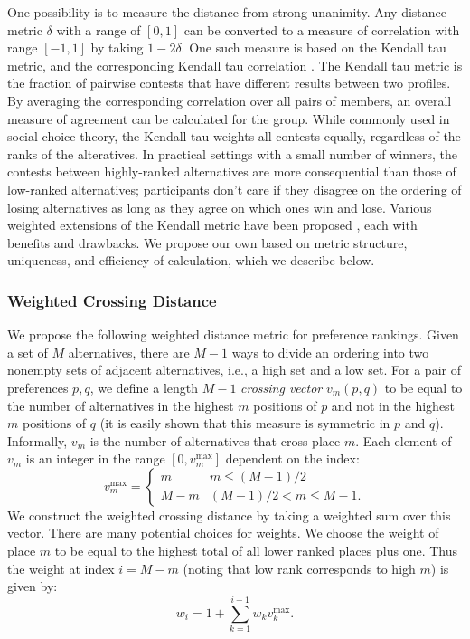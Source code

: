 One possibility is to measure the distance from strong unanimity.
Any distance metric $\delta$ with a range of $[0,1]$ can be converted to a measure of correlation with range $[-1, 1]$ by taking $1 - 2\delta$.
One such measure is based on the Kendall tau metric, and the corresponding Kendall tau correlation \cite{kendall_new_1938}.
The Kendall tau metric is the fraction of pairwise contests that have different results between two profiles.
By averaging the corresponding correlation over all pairs of members, an overall measure of agreement can be calculated for the group.
While commonly used in social choice theory, the Kendall tau weights all contests equally, regardless of the ranks of the alteratives.
In practical settings with a small number of winners, the contests between highly-ranked alternatives are more consequential than those of low-ranked alternatives;
participants don't care if they disagree on the ordering of losing alternatives as long as they agree on which ones win and lose.
Various weighted extensions of the Kendall metric have been proposed \cite{shieh_weighted_1998, can_weighted_2014},
each with benefits and drawbacks.
We propose our own based on metric structure, uniqueness, and efficiency of calculation, which we describe below.

\subsubsection{Weighted Crossing Distance}
We propose the following weighted distance metric for preference rankings.
Given a set of $M$ alternatives, there are $M-1$ ways to divide an ordering into two nonempty sets of adjacent alternatives, i.e., a high set and a low set.
For a pair of preferences $p, q$, we define a length $M - 1$ {\em crossing vector} $v_m(p, q)$ to be equal to the number of alternatives in the highest $m$ positions of $p$ and not in the highest $m$ positions of $q$ (it is easily shown that this measure is symmetric in $p$ and $q$).
Informally, $v_m$ is the number of alternatives that cross place $m$.
Each element of $v_m$ is an integer in the range $[0, v_m^{\max}]$ dependent on the index:
\begin{equation}
    v_m^{\max} =
    \begin{cases}
    m & m \leq (M - 1) / 2 \\
    M - m & (M - 1) / 2 < m \leq M - 1.
    \end{cases}
\end{equation}
We construct the weighted crossing distance by taking a weighted sum over this vector.
There are many potential choices for weights.
We choose the weight of place $m$ to be equal to the highest total of all lower ranked places plus one.
Thus the weight at index $i = M - m$ (noting that low rank corresponds to high $m$) is given by:
\begin{equation}
    w_i = 1 + \sum_{k=1}^{i-1} w_k v_k^{\max}.
\end{equation}

